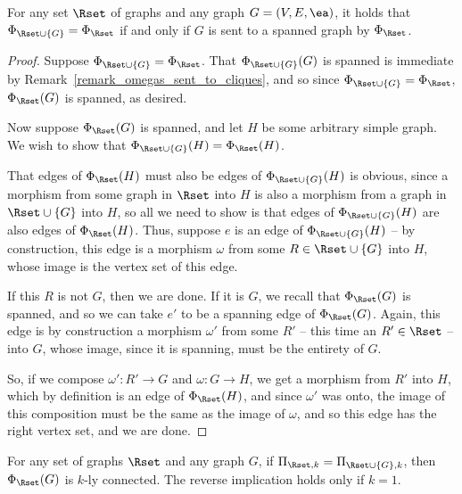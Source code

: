 \documentclass[a4paper,reqno,oneside]{article} %
\begin{document}
\begin{lemma} \label{lemma_representation_hull}
    For any set $\Rset$ of graphs and any graph $G = (V, E, \ea)$, it holds that $\Phi_{\Rset \cup \{G\}} = \Phi_\Rset$ if and only if $G$ is sent to a spanned graph by $\Phi_\Rset$.

    \begin{proof}
        Suppose $\Phi_{\Rset \cup \{G\}} = \Phi_\Rset$. That $\Phi_{\Rset \cup \{G\}}(G)$ is spanned is immediate by Remark~\ref{remark_omegas_sent_to_cliques}, and so since $\Phi_{\Rset \cup \{G\}} = \Phi_\Rset$, $\Phi_\Rset(G)$ is spanned, as desired.

        Now suppose $\Phi_\Rset(G)$ is spanned, and let $H$ be some arbitrary simple graph. We wish to show that $\Phi_{\Rset \cup \{G\}}(H) = \Phi_\Rset(H)$. 
        
        That edges of $\Phi_\Rset(H)$ must also be edges of $\Phi_{\Rset \cup \{G\}}(H)$ is obvious, since a morphism from some graph in $\Rset$ into $H$ is also a morphism from a graph in $\Rset \cup \{G\}$ into $H$, so all we need to show is that edges of $\Phi_{\Rset \cup \{G\}}(H)$ are also edges of $\Phi_\Rset(H)$. Thus, suppose $e$ is an edge of $\Phi_{\Rset \cup \{G\}}(H)$ -- by construction, this edge is a morphism $\omega$ from some $R \in \Rset \cup \{G\}$ into $H$, whose image is the vertex set of this edge.

        If this $R$ is not $G$, then we are done. If it is $G$, we recall that $\Phi_\Rset(G)$ is spanned, and so we can take $e'$ to be a spanning edge of $\Phi_\Rset(G)$. Again, this edge is by construction a morphism $\omega'$ from some $R'$ -- this time an $R' \in \Rset$ -- into $G$, whose image, since it is spanning, must be the entirety of $G$.

        So, if we compose $\omega': R' \to G$ and $\omega: G \to H$, we get a morphism from $R'$ into $H$, which by definition is an edge of $\Phi_\Rset(H)$, and since $\omega'$ was onto, the image of this composition must be the same as the image of $\omega$, and so this edge has the right vertex set, and we are done.
    \end{proof}
\end{lemma}

\begin{lemma}\label{lemma_connected_representation_hull}
    For any set of graphs $\Rset$ and any graph $G$, if $\Pi_{\Rset,k} = \Pi_{\Rset\cup\{G\},k}$, then $\Phi_\Rset(G)$ is $k$-ly connected. The reverse implication holds only if $k = 1$.
\end{lemma}
\end{document}
